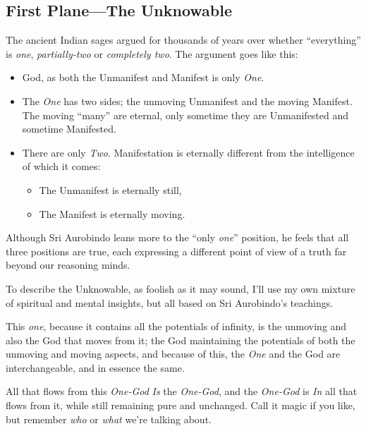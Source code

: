 \documentclass[12pt,a4paper]{book}
\begin{document}
\newpage
\begin{center}\section*{First Plane---The Unknowable}\end{center}

The ancient Indian sages argued for thousands of years over whether
``everything'' is \emph{one}, \emph{partially-two} or \emph{completely
  two}. The argument goes like this:

\label{label1}
\begin{itemize}
\renewcommand{\labelitemi}{$\diamond$}
\item God, as both the Unmanifest and Manifest is only \emph{One}.

\item The \emph{One} has two sides; the unmoving Unmanifest and the
  moving Manifest. The moving ``many'' are eternal, only sometime they
  are Unmanifested and sometime Manifested.

\item There are only \emph{Two}. Manifestation is eternally different
  from the intelligence of which it comes:

\begin{itemize}
\item The Unmanifest is eternally still,

\item The Manifest is eternally moving.
\end{itemize}

\end{itemize}

Although Sri Aurobindo leans more to the ``only \emph{one}'' position, he
feels that all three positions are true, each expressing a different
point of view of a truth far beyond our reasoning minds.

To describe the Unknowable, as foolish as it may sound, I'll use my
own mixture of spiritual and mental insights, but all based on Sri
Aurobindo's teachings.

This \emph{one}, because it contains all the potentials of infinity,
is the unmoving and also the God that moves from it; the God
maintaining the potentials of both the unmoving and moving aspects,
and because of this, the \emph{One} and the God are interchangeable,
and in essence the same.

All that flows from this \emph{One-God} \emph{Is} the \emph{One-God},
and the \emph{One-God} is \emph{In} all that flows from it, while
still remaining pure and unchanged. Call it magic if you like, but
remember \emph{who} or \emph{what} we're talking about.
\end{document}
